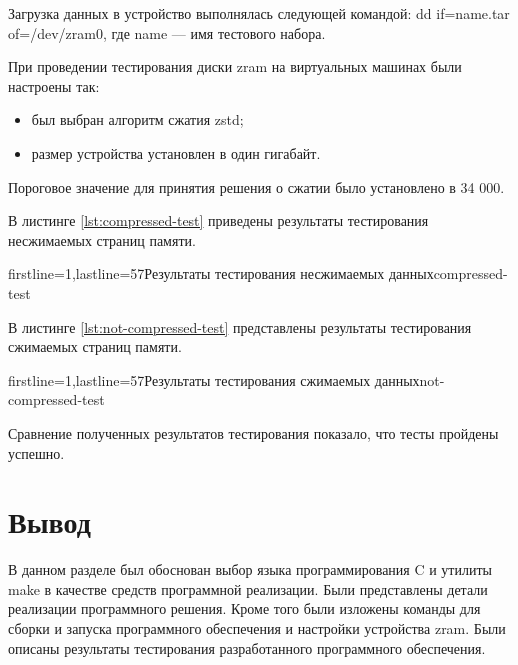 Загрузка данных в устройство выполнялась следующей командой: dd if=name.tar of=/dev/zram0, где name --- имя тестового набора.

При проведении тестирования диски zram на виртуальных машинах были настроены так:

\begin{itemize}
    \item был выбран алгоритм сжатия zstd;
    \item размер устройства установлен в один гигабайт.
\end{itemize}

Пороговое значение для принятия решения о сжатии было установлено в 34 000.

В листинге \ref{lst:compressed-test} приведены результаты тестирования несжимаемых страниц памяти.

    {firstline=1,lastline=57}{Результаты тестирования несжимаемых данных}{compressed-test}{}

В листинге \ref{lst:not-compressed-test} представлены результаты тестирования сжимаемых страниц памяти.

    {firstline=1,lastline=57}{Результаты тестирования сжимаемых данных}{not-compressed-test}{}

Сравнение полученных результатов тестирования показало, что тесты пройдены успешно.

\section*{Вывод}

В данном разделе был обоснован выбор языка программирования C и утилиты make в качестве средств программной реализации. Были представлены детали реализации программного решения. Кроме того были изложены команды для сборки и запуска программного обеспечения и настройки устройства zram. Были описаны результаты тестирования разработанного программного обеспечения.
